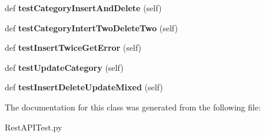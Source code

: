\begin{DoxyCompactItemize}
\item 
def {\bfseries test\+Category\+Insert\+And\+Delete} (self)\hypertarget{classRestAPITest_1_1TestCase_af3ca50bf81f82f040b450a53770966ac}{}\label{classRestAPITest_1_1TestCase_af3ca50bf81f82f040b450a53770966ac}

\item 
def {\bfseries test\+Category\+Intert\+Two\+Delete\+Two} (self)\hypertarget{classRestAPITest_1_1TestCase_aa0d0213c10bc06204e252df18be8e158}{}\label{classRestAPITest_1_1TestCase_aa0d0213c10bc06204e252df18be8e158}

\item 
def {\bfseries test\+Insert\+Twice\+Get\+Error} (self)\hypertarget{classRestAPITest_1_1TestCase_a95ef586734b6bda79fd2659c04d7ea4a}{}\label{classRestAPITest_1_1TestCase_a95ef586734b6bda79fd2659c04d7ea4a}

\item 
def {\bfseries test\+Update\+Category} (self)\hypertarget{classRestAPITest_1_1TestCase_acb4ce000898b4472017e65ae5bec8433}{}\label{classRestAPITest_1_1TestCase_acb4ce000898b4472017e65ae5bec8433}

\item 
def {\bfseries test\+Insert\+Delete\+Update\+Mixed} (self)\hypertarget{classRestAPITest_1_1TestCase_a7170534ba8a62c173741c1e021ee37bf}{}\label{classRestAPITest_1_1TestCase_a7170534ba8a62c173741c1e021ee37bf}

\end{DoxyCompactItemize}


The documentation for this class was generated from the following file\+:\begin{DoxyCompactItemize}
\item 
Rest\+A\+P\+I\+Test.\+py\end{DoxyCompactItemize}
